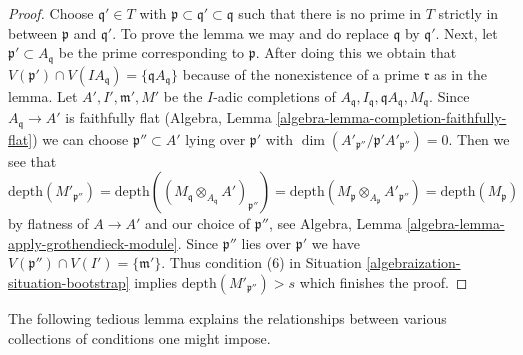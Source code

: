 \begin{proof}

Choose $\mathfrak q' \in T$ with
$\mathfrak p \subset \mathfrak q' \subset \mathfrak q$
such that there is no prime in $T$ strictly
in between $\mathfrak p$ and $\mathfrak q'$. To prove the lemma
we may and do replace $\mathfrak q$ by $\mathfrak q'$.
Next, let $\mathfrak p' \subset A_\mathfrak q$ be the prime corresponding to
$\mathfrak p$. After doing this we obtain that
$V(\mathfrak p') \cap V(IA_\mathfrak q) = \{\mathfrak q A_\mathfrak q\}$
because of the nonexistence of a prime $\mathfrak r$ as in the lemma.
Let $A', I', \mathfrak m', M'$ be the $I$-adic completions of
$A_\mathfrak q, I_\mathfrak q, \mathfrak qA_\mathfrak q, M_\mathfrak q$.
Since $A_\mathfrak q \to A'$ is faithfully flat
(Algebra, Lemma \ref{algebra-lemma-completion-faithfully-flat})
we can choose $\mathfrak p'' \subset A'$ lying over $\mathfrak p'$
with $\dim(A'_{\mathfrak p''}/\mathfrak p' A'_{\mathfrak p''}) = 0$.
Then we see that
$$
\text{depth}(M'_{\mathfrak p''}) =
\text{depth}((M_\mathfrak q \otimes_{A_\mathfrak q} A')_{\mathfrak p''}) =
\text{depth}(M_\mathfrak p \otimes_{A_\mathfrak p} A'_{\mathfrak p''}) =
\text{depth}(M_\mathfrak p)
$$
by flatness of $A \to A'$ and our choice of $\mathfrak p''$, see
Algebra, Lemma \ref{algebra-lemma-apply-grothendieck-module}.
Since $\mathfrak p''$ lies over $\mathfrak p'$ we have
$V(\mathfrak p'') \cap V(I') = \{\mathfrak m'\}$. Thus
condition (6) in Situation \ref{algebraization-situation-bootstrap} implies
$\text{depth}(M'_{\mathfrak p''}) > s$ which finishes the proof.
\end{proof}

The following tedious lemma explains the relationships between various
collections of conditions one might impose.

